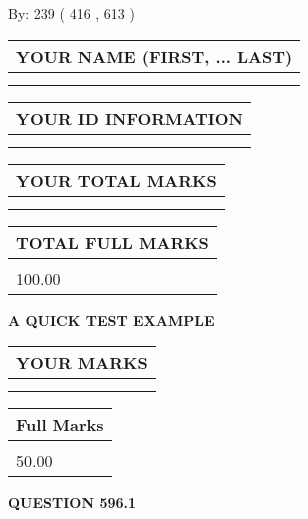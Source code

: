 \documentclass[12pt]{article}
\begin{document}
   
\hspace{1.0in} By: 
 239 ( 416 ,  613 )
   
   
   
   
\newpage 
\setcounter{page}{ 
   596001 } 
   
   
   
   
\noindent\begin{tabular}{|l|}
\hline
YOUR NAME (FIRST, ... LAST)  \\
\hline
 \\ 
 \\ 
\hline
\end{tabular}
\hspace{0.05in} \begin{tabular}{|l|}
\hline
 YOUR   ID   INFORMATION  \\
\hline
 \\ 
 \\ 
\hline
\end{tabular}
   
   
\vspace{0.2in}\noindent\begin{tabular}{|l|}
\hline
YOUR TOTAL MARKS  \\
\hline
 \\ 
 \\ 
\hline
\end{tabular}
\hspace{0.05in} \begin{tabular}{|l|}
\hline
TOTAL FULL MARKS  \\
\hline
 \\ 
100.00 \\
\hline
\end{tabular}
   
   
 \vspace{0.2in}
{\LARGE {\textbf{ A QUICK TEST EXAMPLE}}}
   
   
  
\vspace{0.2in}
  
\noindent\begin{tabular}{|l|}
\hline
 YOUR MARKS  \\
\hline
 \\ 
 \\ 
\hline
\end{tabular}
\hspace{0.05in} \begin{tabular}{|l|}
\hline
 Full Marks  \\
\hline
 \\ 
50.00 \\
\hline
\end{tabular}
{\textbf{\Large{QUESTION
596.1 
}}}
  
\end{document}

